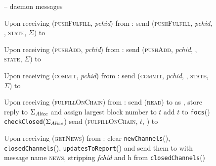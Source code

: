   \begin{figure}[H]
    \begin{systembox}{\fpaynet{} -- daemon messages}
      \begin{algorithmic}[1]
        \State Upon receiving (\textsc{pushFulfill}, \textit{pchid}) from
        \alice:
        \Indent
          \State send (\textsc{pushFulfill}, \textit{pchid}, \alice,
          \textsc{state}, $\Sigma$) to \simulator
          \label{alg:fpaynet:daemon:fulfill}
        \EndIndent
        \Statex

        \State Upon receiving (\textsc{pushAdd}, \textit{pchid}) from \alice:
        \Indent
          \State send (\textsc{pushAdd}, \textit{pchid}, \alice, \textsc{state},
          $\Sigma$) to \simulator
          \label{alg:fpaynet:daemon:add}
        \EndIndent
        \Statex

        \State Upon receiving (\textsc{commit}, \textit{pchid}) from \alice:
        \Indent
          \State send (\textsc{commit}, \textit{pchid}, \alice, \textsc{state},
          $\Sigma$) to \simulator
          \label{alg:fpaynet:daemon:commit}
        \EndIndent
        \Statex

        \State Upon receiving (\textsc{fulfillOnChain}) from \alice:
        \Indent
          \State send (\textsc{read}) to \ledger{} as \alice{}, store reply to
          $\Sigma_{\mathit{Alice}}$ and assign largest block number to $t$
          \label{alg:fpaynet:daemon:foc:read}
          \State add $t$ to \texttt{focs}(\alice)
          \State \texttt{checkClosed}($\Sigma_{\mathit{Alice}}$)
          \State send (\textsc{fulfillOnChain}, $t$, \alice) to \simulator
        \EndIndent
        \Statex

        \State Upon receiving (\textsc{getNews}) from \alice:
        \label{alg:fpaynet:getnews}
        \Indent
          \State clear \texttt{newChannels}(\alice),
          \texttt{closedChannels}(\alice), \texttt{updatesToReport}(\alice) and
          send them to \alice{} with message name \textsc{news}, stripping
          \textit{fchid} and h from \texttt{closedChannels}(\alice)
          \label{alg:fpaynet:getnews:send}
        \EndIndent
      \end{algorithmic}
    \end{systembox}
    \caption{}
    \label{alg:fpaynet:daemon}
  \end{figure}
